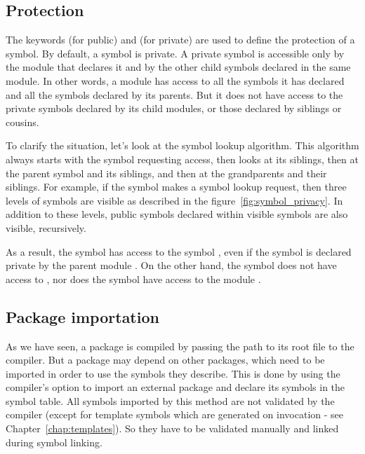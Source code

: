 \subsection{Protection}
\label{sec:symbol_protection}

The keywords  (for public) and  (for private) are used
to define the protection of a symbol. By default, a symbol is private. A private
symbol is accessible only by the module that declares it and by the other child
symbols declared in the same module. In other words, a module has access to all
the symbols it has declared and all the symbols declared by its parents. But it
does not have access to the private symbols declared by its child modules, or
those declared by siblings or cousins.

To clarify the situation, let's look at the symbol lookup algorithm. This
algorithm always starts with the symbol requesting access, then looks at its
siblings, then at the parent symbol and its siblings, and then at the
grandparents and their siblings. For example, if the symbol
 makes a symbol lookup request, then three levels
of symbols are visible as described in the figure~\ref{fig:symbol_privacy}. In
addition to these levels, public symbols declared within visible symbols are
also visible, recursively.



As a result, the symbol  has access to the symbol
, even if the symbol  is declared
private by the parent module . On the other hand, the symbol
 does not have access to
, nor does the symbol  have access to
the module .

\subsection{Package importation}

As we have seen, a package is compiled by passing the path to its root file to
the compiler. But a package may depend on other packages, which need to be
imported in order to use the symbols they describe. This is done by using the
compiler's  option to import an external package and declare its
symbols in the symbol table. All symbols imported by this method are not
validated by the compiler (except for template symbols which are generated on
invocation - see Chapter~\ref{chap:templates}). So they have to be validated
manually and linked during symbol linking.


